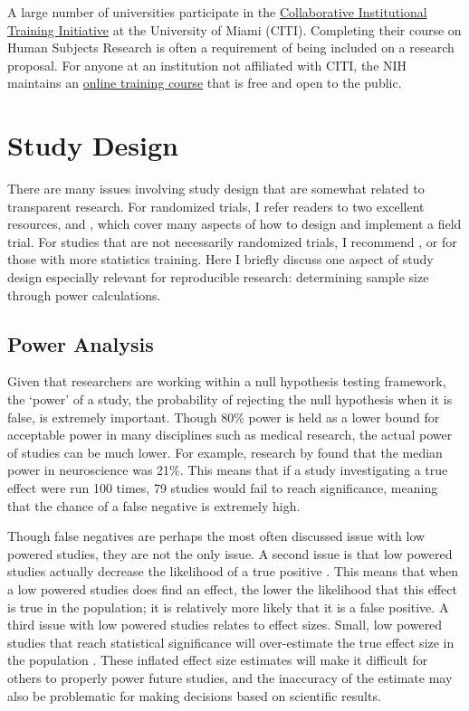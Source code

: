 \documentclass[12pt] {article}
\begin{document}
A large number of universities participate in the \href{https://www.citiprogram.org/}{Collaborative Institutional Training Initiative} at the University of Miami (CITI). Completing their course on Human
Subjects Research is often a requirement of being included on a research
proposal. For anyone at an institution not affiliated with CITI, the NIH maintains an \href{https://phrp.nihtraining.com/users/login.php}{online training course} that is free and open to the public.
\section{Study Design}\label{study-design}
There are many issues involving study design that are somewhat related to transparent research. For randomized trials, I refer readers to two excellent resources, \cite{randomizationtoolkit} and \cite{glennerster_running_2013}, which cover many aspects of how to design and implement a field trial. For studies that are not necessarily randomized trials, I recommend \cite{gertler_impact_2011}, or \cite{angrist2008mostly} for those with more statistics training. Here I briefly discuss one aspect of study design especially relevant for reproducible research: determining sample size through power calculations.
  
\subsection{Power Analysis}\label{Conducting Power Analysis}
Given that researchers are working within a null hypothesis testing framework, the ‘power’ 
of a study, the probability of rejecting the null hypothesis when it is false, is extremely 
important. Though 80\% power is held as a lower bound for acceptable power in many disciplines 
such as medical research, the actual power of studies can be much lower. For example, research 
by \cite{button_power_2013} found that the median power in neuroscience was 21\%. This means that 
if a study investigating a true effect were run 100 times, 79 studies would fail to reach significance, 
meaning that the chance of a false negative is extremely high. 

Though false negatives are perhaps the most often discussed issue with low powered studies, they are not the only issue. A second issue is that low powered studies actually decrease the likelihood of a true positive \citep{button_power_2013}. 
This means that when a low powered studies does find an effect, the lower the likelihood that this effect is true in 
the population; it is relatively more likely that it is a false positive.  A third issue with low powered studies relates to effect 
sizes. Small, low powered studies that reach statistical significance will over-estimate the true effect size in the population \citep{button_power_2013}. These inflated effect size estimates will make it difficult for others to properly power future 
studies, and the inaccuracy of the estimate may also be problematic for making decisions based on scientific results. 
 
\end{document}
